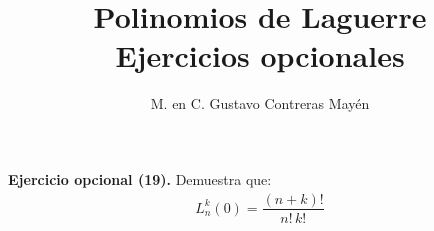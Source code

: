
\title{Polinomios de Laguerre \\[0.3em]  \large{Ejercicios opcionales} \vspace{-3ex}}
\author{M. en C. Gustavo Contreras Mayén}
\date{ }


\vspace{-4cm}
\maketitle
\fontsize{14}{14}\selectfont


\noindent
\textbf{Ejercicio opcional (19).} Demuestra que:
\begin{align*}
L_{n}^{k} (0) = \dfrac{(n + k)!}{n! \, k!}
\end{align*}
